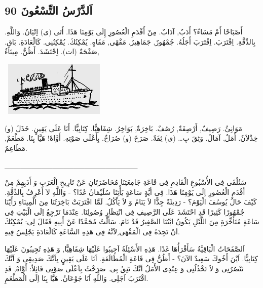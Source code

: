 \documentclass[a5paper]{article}
\begin{document}
\subsection{اَلدَّرْسُ التِّسْعُونَ 90}
أَصْبَاحًا أَمْ مَسَاءً؟ أَدَبٌ, آدَابٌ. مِنْ أَقْدَمِ الْعُصُورِ إِلَى يَوْمِنَا هَذَا. أَتَى (ى) اِتْيَانٌ. وَاللَّهِ. بِالدِّقَّةِ. اِقْتَرَبَ. اِقْتَرَبَ أَجَلُهُ. جُمْهُورٌ, جَمَاهِيرُ. مَقْهًى, مَقَاهٍ. يُمْكِنُكَ. يُمْكِنُنِى. كَالْعَادَةِ. بَاقٍ. صَفْحَةٌ (ات). اِحْتَشَدَ. أَظُنُّ. مِينَاءٌ, 

\  \includegraphics[width=1.8854in,height=1.0311in]{MuhammadBagauddinlatinized-img253.png} 

مَوَانِئُ. رَصِيفٌ, أَرْصِفَةٌ, رُصُفٌ. بَاخِرَةٌ, بَوَاخِرُ. شِفَاهِيًّا. كِتَابِيًّا. أَنَا عَلَى يَقِينٍ. خَذَلَ (و) خِذْلاَنٌ. أَمَلٌ, آمَالٌ. وَثِقَ بِ… (ى) ثِقَةٌ. صَرَخَ (و) صُرَاخٌ. بِأَعْلَى صَوْتِهِ. أَوَّاهْ! هَيَّا بِنَا. مَطْعَمٌ, مَطَاعِمُ.

\_\_\_\_\_\_\_\_\_\_\_\_\_\_\_\_\_\_\_\_\_\_\_\_\_

سَتُلْقَى فِى الأُسْبُوعِ الْقَادِمِ فِى قَاعَةِ جَامِعَتِنَا مُحَاضَرَتَانِ عَنْ تَارِيخِ الْعَرَبِ وَ أَدَبِهِمْ مِنْ أَقْدَمِ الْعُصُورِ اِلَى يَوْمِنَا هَذَا. فِى أَيَّةٍ سَاعَةٍ يَأْتِنَا سُلَيْمَانُ غَدًا؟ - وَاللَّهِ لاَ أَعْرِفُ بِالدِّقَّةِ. كَيْفَ حَالُ يُوسُفَ الْيَوْمَ؟ - رَدِيئَةٌ جِدًّا لاَ يَنَامُ وَ لاَ يَاْكُلُ. لَمَّا اقْتَرَبَتْ بَاخِرَتُنَا مِنَ الْمِينَاءِ رَأَيْنَا جُمْهُورًا كَثِيرًا قَدِ احْتَشَدَ عَلَى الرَّصِيفِ فِى انْتِظَارِ وُصُولِنَا. عِنْدَمَا نَرْجِعُ اِلَى الْبَيْتِ فِى سَاعَةٍ مُتَأَخِّرَةٍ مِنَ اللَّيْلِ يَكُونُ ابْنُنَا الصَّغِيرُ قَدْ نَامَ. سَأَلْتُ مُحَمَّدًا عَنْ أَبِيهِ فَقَالَ لِى: يُمْكِنُكَ اَنْ تَجِدَهُ فِى الْمَقْهَى ِلاَنَّهُ فِى هَذِهِ السَّاعَةِ كَالْعَادَةِ يَجْلِسُ فِيهِ.

اَلصَّفَحَاتُ الْبَاقِيَّةُ سَأَقْرَأُهَا غَدًا. هَذِهِ الأَسْئِلَةُ اَجِيبُوا عَلَيْهَا شِفَاهِيًّا, وَ هَذِهِ تُجِيبُونَ عَلَيْهَا كِتَابِيًّا. اَيْنَ أَخُوكَ سَعِيدٌ الآنَ؟ - أَظُنُّ فِى قَاعَةِ الْمُطَالَعَةِ. اَنَا عَلَى يَقِينٍ بِاَنَّكَ صَدِيقِى وَ اَنَّكَ تَنْصُرُنِى وَ لاَ تَخْذُلُنِى وَ عِنْدِى الأَمَلُ اَنَّكَ تَثِقُ بِى. صَرَخْتُ بِاَعْلَى صَوْتِى قَائِلاً: أَوَّاهْ, قَدِ اقْتَرَبَ اَجَلِى. وَاللَّهِ اَنَا جَوْعَانُ. هَيَّا بِنَا اِلَى الْمَطْعَمِ.
\end{document}

